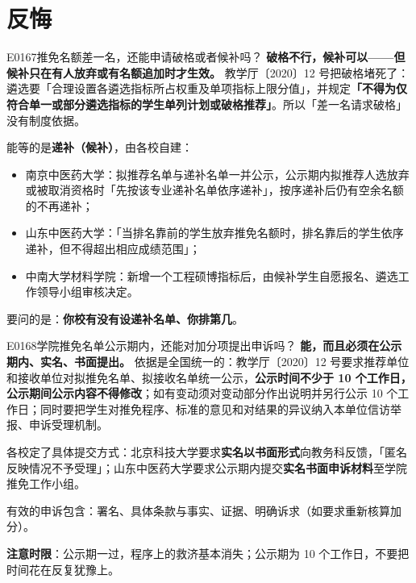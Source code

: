\section{反悔}
\begin{qa}{E0167}{推免名额差一名，还能申请破格或者候补吗？}
\textbf{破格不行，候补可以——但候补只在有人放弃或有名额追加时才生效。}
教学厅〔2020〕12 号把破格堵死了：遴选要「合理设置各遴选指标所占权重及单项指标上限分值」，并规定\textbf{「不得为仅符合单一或部分遴选指标的学生单列计划或破格推荐」}。所以「差一名请求破格」没有制度依据。

能等的是\textbf{递补（候补）}，由各校自建：
\begin{itemize}
  \item 南京中医药大学：拟推荐名单与递补名单一并公示，公示期内拟推荐人选放弃或被取消资格时「先按该专业递补名单依序递补」，按序递补后仍有空余名额的不再递补；
  \item 山东中医药大学：「当排名靠前的学生放弃推免名额时，排名靠后的学生依序递补，但不得超出相应成绩范围」；
  \item 中南大学材料学院：新增一个工程硕博指标后，由候补学生自愿报名、遴选工作领导小组审核决定。
\end{itemize}

要问的是：\textbf{你校有没有设递补名单、你排第几}。
\end{qa}

\begin{qa}{E0168}{学院推免名单公示期内，还能对加分项提出申诉吗？}
\textbf{能，而且必须在公示期内、实名、书面提出。}
依据是全国统一的：教学厅〔2020〕12 号要求推荐单位和接收单位对拟推免名单、拟接收名单统一公示，\textbf{公示时间不少于 10 个工作日，公示期间公示内容不得修改}；如有变动须对变动部分作出说明并另行公示 10 个工作日；同时要把学生对推免程序、标准的意见和对结果的异议纳入本单位信访举报、申诉受理机制。

各校定了具体提交方式：北京科技大学要求\textbf{实名以书面形式}向教务科反馈，「匿名反映情况不予受理」；山东中医药大学要求公示期内提交\textbf{实名书面申诉材料}至学院推免工作小组。

有效的申诉包含：署名、具体条款与事实、证据、明确诉求（如要求重新核算加分）。

\textbf{注意时限}：公示期一过，程序上的救济基本消失；公示期为 10 个工作日，不要把时间花在反复犹豫上。
\end{qa}

